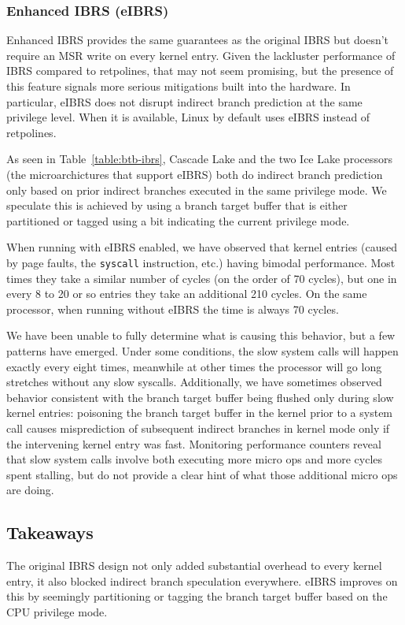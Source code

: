 \subsubsection{Enhanced IBRS (eIBRS)}

Enhanced IBRS provides the same guarantees as the original IBRS but doesn't require an MSR write on every kernel entry.
Given the lackluster performance of IBRS compared to retpolines, that may not seem promising, but the presence of this feature signals more serious mitigations built into the hardware.
In particular, eIBRS does not disrupt indirect branch prediction at the same privilege level.
When it is available, Linux by default uses eIBRS instead of retpolines.

As seen in Table~\ref{table:btb-ibrs}, Cascade Lake and the two Ice Lake
processors (the microarchictures that support eIBRS) both do indirect branch prediction only based on prior indirect branches executed in the same privilege mode.
We speculate this is achieved by using a branch target buffer that is either partitioned or tagged using a bit indicating the current privilege mode.

When running with eIBRS enabled, we have observed that kernel entries (caused by page faults, the \texttt{syscall} instruction, etc.) having bimodal performance.
Most times they take a similar number of cycles (on the order of 70 cycles), but one in every 8 to 20 or so entries they take an additional 210 cycles.
On the same processor, when running without eIBRS the time is always 70 cycles.

We have been unable to fully determine what is causing this behavior, but a few patterns have emerged.
Under some conditions, the slow system calls will happen exactly every eight times, meanwhile at other times the processor will go long stretches without any slow syscalls.
Additionally, we have sometimes observed behavior consistent with the branch target buffer being flushed only during slow kernel entries: poisoning the branch target buffer in the kernel prior to a system call causes misprediction of subsequent indirect branches in kernel mode only if the intervening kernel entry was fast.
Monitoring performance counters reveal that slow system calls involve both executing more micro ops and more cycles spent stalling, but do not provide a clear hint of what those additional micro ops are doing.

\subsection{Takeaways}
The original IBRS design not only added substantial overhead to every kernel entry, it also blocked indirect branch speculation everywhere.
eIBRS improves on this by seemingly partitioning or tagging the branch target buffer based on the CPU privilege mode.

